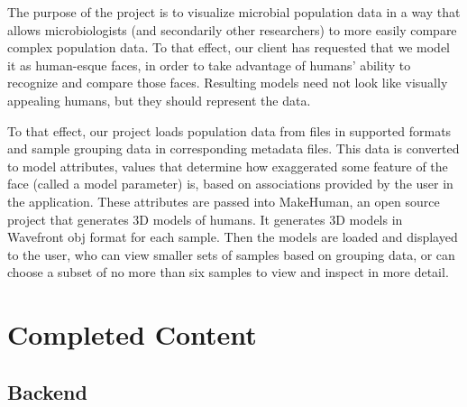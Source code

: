 \documentclass[letterpaper,10pt, onecolumn, draftclsnofoot]{IEEEtran}
\begin{document}
The purpose of the project is to visualize microbial population data in a way that allows microbiologists (and secondarily other researchers) to more easily compare complex population data. To that effect, our client has requested that we model it as human-esque faces, in order to take advantage of humans' ability to recognize and compare those faces. Resulting models need not look like visually appealing humans, but they should represent the data.

To that effect, our project loads population data from files in supported formats and sample grouping data in corresponding metadata files. This data is converted to model attributes, values that determine how exaggerated some feature of the face (called a model parameter) is, based on associations provided by the user in the application. These attributes are passed into MakeHuman, an open source project that generates 3D models of humans. It generates 3D models in Wavefront obj format for each sample. Then the models are loaded and displayed to the user, who can view smaller sets of samples based on grouping data, or can choose a subset of no more than six samples to view and inspect in more detail.

\section{Completed Content}

\subsection{Backend}
\end{document}
